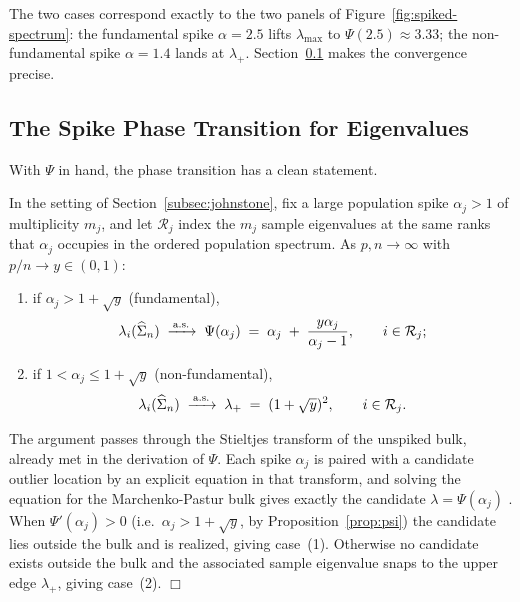 The two cases correspond exactly to the two panels of Figure~\ref{fig:spiked-spectrum}: the fundamental spike \(\alpha = 2.5\) lifts \(\lambda_{\max}\) to \(\Psi(2.5) \approx 3.33\); the non-fundamental spike \(\alpha = 1.4\) lands at \(\lambda_+\). Section~\ref{subsec:bbp} makes the convergence precise.

\subsection{The Spike Phase Transition for Eigenvalues}\label{subsec:bbp}

With \(\Psi\) in hand, the phase transition has a clean statement.

\begin{theorem}\label{thm:bbp}
In the setting of Section~\ref{subsec:johnstone}, fix a large population spike \(\alpha_j > 1\) of multiplicity \(m_j\), and let \(\mathcal{R}_j\) index the \(m_j\) sample eigenvalues at the same ranks that \(\alpha_j\) occupies in the ordered population spectrum. As \(p, n \to \infty\) with \(p/n \to y \in (0, 1)\):
\begin{enumerate}[label=\textnormal{(\arabic*)},leftmargin=*]
  \item if \(\alpha_j > 1 + \sqrt{y}\) (fundamental),
  \[
    \lambda_i(\widehat{\Sigma}_n) \;\xrightarrow{\,\text{a.s.}\,}\; \Psi(\alpha_j) \;=\; \alpha_j \;+\; \frac{y \alpha_j}{\alpha_j - 1}, \qquad i \in \mathcal{R}_j;
  \]
  \item if \(1 < \alpha_j \le 1 + \sqrt{y}\) (non-fundamental),
  \[
    \lambda_i(\widehat{\Sigma}_n) \;\xrightarrow{\,\text{a.s.}\,}\; \lambda_+ \;=\; (1 + \sqrt{y})^2, \qquad i \in \mathcal{R}_j.
  \]
\end{enumerate}
\end{theorem}

\enspace The argument passes through the Stieltjes transform of the unspiked bulk, already met in the derivation of \(\Psi\). Each spike \(\alpha_j\) is paired with a candidate outlier location by an explicit equation in that transform, and solving the equation for the Marchenko-Pastur bulk gives exactly the candidate \(\lambda = \Psi(\alpha_j)\) \citep[][\S~11.2]{YaoZhengBai2015}. When \(\Psi'(\alpha_j) > 0\) (i.e.\ \(\alpha_j > 1 + \sqrt{y}\), by Proposition~\ref{prop:psi}) the candidate lies outside the bulk and is realized, giving case~(1). Otherwise no candidate exists outside the bulk and the associated sample eigenvalue snaps to the upper edge \(\lambda_+\), giving case~(2). \(\Box\)


